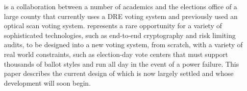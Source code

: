 \projname is a collaboration between a number of academics and
the elections office of a large county that currently uses a DRE
voting system and previously used an optical scan voting system. 
\projname represents a rare opportunity for a variety of
sophisticated technologies, such as end-to-end cryptography and risk limiting
audits, to be designed into a new voting system, from scratch, with
a variety of real world constraints, such as election-day vote centers
that must support thousands of ballot styles and run
all day in the event of a power failure. This paper describes the
current design of \projname which is now largely settled and whose
development will soon begin.


